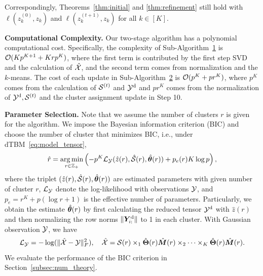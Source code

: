 \documentclass[lettersize,onecolumn,journal]{IEEEtran}
\theoremstyle{definition}
\theoremstyle{definition}
\newcommand{\of}[1]{\left(#1\right)}
\begin{document}
{Correspondingly, Theorems~\ref{thm:initial} and \ref{thm:refinement} still hold with $\ell(z^{(0)}_k, z_k)$ and $\ell(z^{(t+1)}_k, z_k)$  for all $k \in [K]$.

{\bf Computational Complexity.} Our two-stage algorithm has a polynomial computational cost. Specifically, the complexity of Sub-Algorithm~\hyperref[alg:main]{1} is $\mathcal{O}(K p^{K+1} + Krp^K)$, where the first term is contributed by the first step SVD and the calculation of $\hat {\mathcal{X}}$, and the second term comes from normalization and the $k$-means.  The cost of each update in Sub-Algorithm~\hyperref[alg:main]{2} is $\mathcal{O}(p^K + pr^K)$, where $p^K$ comes from the calculation of $\mathcal{S}^{(t)}$ and $\mathcal{Y}^{\text{d}}$ and $pr^K$ comes from the normalization of $\mathcal{Y}^{\text{d}}, \mathcal{S}^{(t)}$ and the cluster assignment update in Step 10.


{\bf Parameter Selection.} Note that we assume the number of clusters $r$ is given for the algorithm. We impose the Bayesian information criterion (BIC)
and choose the number of cluster that minimizes BIC, i.e., under dTBM~\eqref{eq:model_tensor},
\begin{equation}
    \hat r = \argmin_{r \in \mathbb{Z}_+ } \of{ -p^K \tL_{\tY}(\hat z(r), \hat \tS(r), \hat \mtheta(r)) + p_e(r) K \log p},
\end{equation}
where the triplet $(\hat z(r), \hat {\mathcal{S}}(r), \hat {\boldsymbol{\theta}}(r))$ are estimated parameters with given number of cluster $r$, $\mathcal{L}_{\mathcal{Y}}$ denote the log-likelihood with observations $\mathcal{Y}$, and $p_e = r^K + p(\log r + 1)$ is the effective number of parameters. Particularly, we obtain the estimate $\hat {\boldsymbol{\theta}}(r)$ by first calculating the reduced tensor $\mathcal{Y}^{\text{d}}$ with $\hat z(r)$ and then normalizing the row norms $\lVert\bm Y_{i:}^{\text{d}}\rVert$ to 1 in each cluster. With Gaussian observation $\mathcal{Y}$, we have
\begin{equation}
    \mathcal{L}_{\mathcal{Y}} = - \log(\lVert\hat {\mathcal{X}} - \mathcal{Y}\rVert_F^2), \quad \hat {\mathcal{X}} = \mathcal{S}(r) \times_1 \hat {\boldsymbol{\Theta}}(r) \hat {\bm M}(r) \times_2 \cdots \times_K \hat {\boldsymbol{\Theta}}(r) \hat {\bm M}(r).
\end{equation}
We evaluate the performance of the BIC criterion in Section~\ref{subsec:num_theory}.


}
\end{document}

